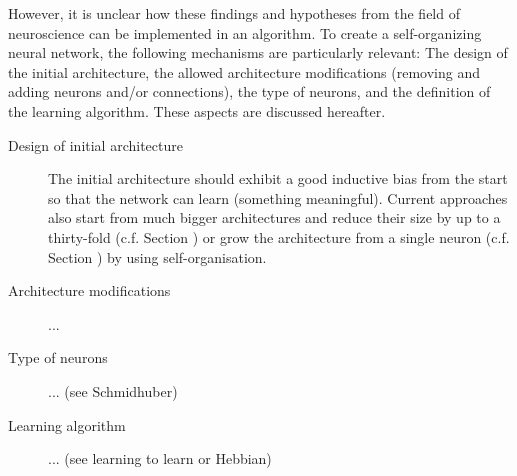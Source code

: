 However, it is unclear how these findings and hypotheses from the field of neuroscience can be implemented in an algorithm.
To create a self-organizing neural network, the following mechanisms are particularly relevant: The design of the initial architecture, the allowed architecture modifications (removing and adding neurons and/or connections), the type of neurons, and the definition of the learning algorithm.
These aspects are discussed hereafter.

\begin{description}
   \item[Design of initial architecture] The initial architecture should exhibit a good inductive bias from the start so that the network can learn (something meaningful). Current approaches also start from much bigger architectures and reduce their size by up to a thirty-fold  (c.f. Section ) or grow the architecture from a single neuron  (c.f. Section ) by using self-organisation.
   \item[Architecture modifications] ...
   \item[Type of neurons] ... (see Schmidhuber)
   \item[Learning algorithm] ... (see learning to learn or Hebbian)
\end{description}

